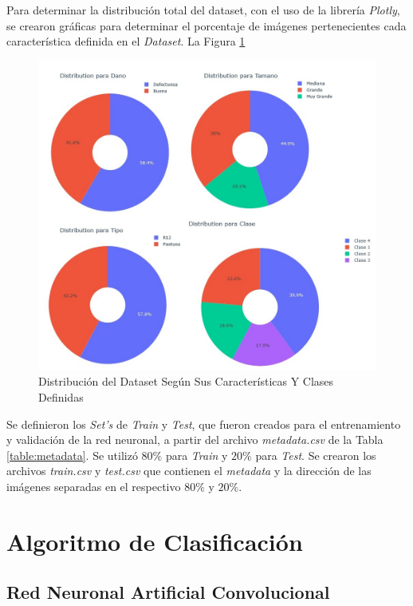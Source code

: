 	Para determinar la distribución total del dataset, con el uso de la librería \textit{Plotly}, se crearon gráficas para determinar el porcentaje de imágenes pertenecientes cada característica definida en el \textit{Dataset}. La Figura \ref{fig:distribuciontipo}
		
	\begin{figure}[ht]
		\centering
		\includegraphics[scale=0.4]{Figs/Distribucion.jpg}
		\caption{Distribución del Dataset Según Sus Características Y Clases Definidas}
		\label{fig:distribuciontipo}
	\end{figure}

	Se definieron los \textit{Set's} de \textit{Train} y \textit{Test}, que fueron creados para el entrenamiento y validación de la red neuronal, a partir del archivo \textit{metadata.csv} de la Tabla \ref{table:metadata}. Se utilizó $80\%$ para \textit{Train} y $20\%$ para \textit{Test}. Se crearon los archivos \textit{train.csv} y \textit{test.csv} que contienen el \textit{metadata} y la dirección de las imágenes separadas en el respectivo $80\%$ y $20\%$.



\newpage
\chapter{Algoritmo de Clasificación}

	\section{Red Neuronal Artificial Convolucional}

